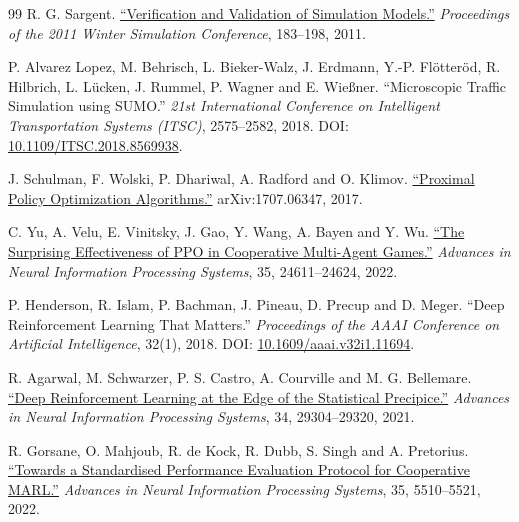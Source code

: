 \documentclass[12pt,a4paper]{article}
\begin{document}
\begin{thebibliography}{99}
 R. G. Sargent. \href{\detokenize{https://www.informs-sim.org/wsc11papers/016.pdf}}{``Verification and Validation of Simulation Models.''} \emph{Proceedings of the 2011 Winter Simulation Conference}, 183--198, 2011.

 P. Alvarez Lopez, M. Behrisch, L. Bieker-Walz, J. Erdmann, Y.-P. Flötteröd, R. Hilbrich, L. Lücken, J. Rummel, P. Wagner and E. Wießner. ``Microscopic Traffic Simulation using SUMO.'' \emph{21st International Conference on Intelligent Transportation Systems (ITSC)}, 2575--2582, 2018. DOI: \href{\detokenize{https://elib.dlr.de/127994/}}{10.1109/ITSC.2018.8569938}.

 J. Schulman, F. Wolski, P. Dhariwal, A. Radford and O. Klimov. \href{\detokenize{https://arxiv.org/abs/1707.06347}}{``Proximal Policy Optimization Algorithms.''} arXiv:1707.06347, 2017.

 C. Yu, A. Velu, E. Vinitsky, J. Gao, Y. Wang, A. Bayen and Y. Wu. \href{\detokenize{https://papers.nips.cc/paper/2022/file/9c1535a02f0ce079433344e14d910597-Paper-Datasets_and_Benchmarks.pdf}}{``The Surprising Effectiveness of PPO in Cooperative Multi-Agent Games.''} \emph{Advances in Neural Information Processing Systems}, 35, 24611--24624, 2022.

 P. Henderson, R. Islam, P. Bachman, J. Pineau, D. Precup and D. Meger. ``Deep Reinforcement Learning That Matters.'' \emph{Proceedings of the AAAI Conference on Artificial Intelligence}, 32(1), 2018. DOI: \href{\detokenize{https://ojs.aaai.org/index.php/AAAI/article/view/11694}}{10.1609/aaai.v32i1.11694}.

 R. Agarwal, M. Schwarzer, P. S. Castro, A. Courville and M. G. Bellemare. \href{\detokenize{https://proceedings.neurips.cc/paper/2021/hash/f514cec81cb148559cf475e7426eed5e-Abstract.html}}{``Deep Reinforcement Learning at the Edge of the Statistical Precipice.''} \emph{Advances in Neural Information Processing Systems}, 34, 29304--29320, 2021.

 R. Gorsane, O. Mahjoub, R. de Kock, R. Dubb, S. Singh and A. Pretorius. \href{\detokenize{https://arxiv.org/abs/2209.10485}}{``Towards a Standardised Performance Evaluation Protocol for Cooperative MARL.''} \emph{Advances in Neural Information Processing Systems}, 35, 5510--5521, 2022.


\end{thebibliography}
\end{document}
